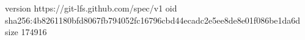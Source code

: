 version https://git-lfs.github.com/spec/v1
oid sha256:4b8261180bfd8067fb794052fc16796cbd44ecadc2e5ee8de8e01f086be1da6d
size 174916
